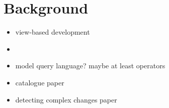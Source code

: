 \section{Background}
\label{sec:Background}

\begin{itemize}
    \item view-based development
    \item \viewtypes
    \item model query language? maybe at least operators
    \item catalogue paper
    \item detecting complex changes paper
\end{itemize}

